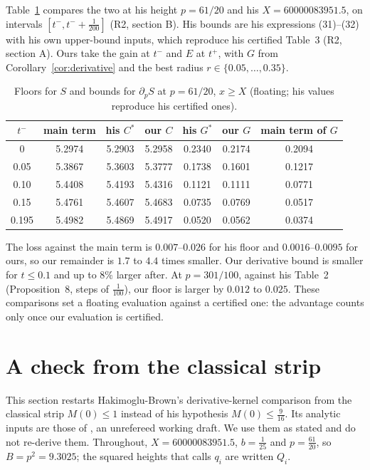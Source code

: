 \documentclass[11pt]{article}
\theoremstyle{definition}
\theoremstyle{remark}
\numberwithin{equation}{section}
\begin{document}
Table~\ref{tab:compare} compares the two at his height $p=61/20$ and his
$X=60000083951.5$, on intervals $[t^-,t^-+\frac1{200}]$ (R2, section B).
His bounds are his expressions (31)--(32) with his own upper-bound inputs,
which reproduce his certified Table~3 (R2, section A). Ours take the gain
at $t^-$ and $E$ at $t^+$, with $G$ from Corollary~\ref{cor:derivative}
and the best radius $r\in\{0.05,\dots,0.35\}$.

\begin{table}[ht]
\centering\small
\begin{tabular}{@{}ccccccc@{}}
\toprule
$t^-$ & main term & his $C^*$ & our $C$ & his $G^*$ & our $G$ & main term of $G$\\
\midrule
0 & 5.2974 & 5.2903 & 5.2958 & 0.2340 & 0.2174 & 0.2094\\
0.05 & 5.3867 & 5.3603 & 5.3777 & 0.1738 & 0.1601 & 0.1217\\
0.10 & 5.4408 & 5.4193 & 5.4316 & 0.1121 & 0.1111 & 0.0771\\
0.15 & 5.4761 & 5.4607 & 5.4683 & 0.0735 & 0.0769 & 0.0517\\
0.195 & 5.4982 & 5.4869 & 5.4917 & 0.0520 & 0.0562 & 0.0374\\
\bottomrule
\end{tabular}
\caption{Floors for $S$ and bounds for $\partial_pS$ at $p=61/20$, $x\ge X$
(floating; his values reproduce his certified ones).}\label{tab:compare}
\end{table}

The loss against the main term is $0.007$--$0.026$ for his floor and
$0.0016$--$0.0095$ for ours, so our remainder is $1.7$ to $4.4$ times
smaller. Our derivative bound is smaller for $t\le0.1$ and up to $8\%$
larger after. At $p=301/100$, against his Table~2 (Proposition~8, steps of
$\frac1{100}$), our floor is larger by $0.012$ to $0.025$. These
comparisons set a floating evaluation against a certified one: the
advantage counts only once our evaluation is certified.

\section{A check from the classical strip}\label{sec:strip}

This section restarts Hakimoglu-Brown's derivative-kernel comparison
\cite[Theorem~12]{hb} from the classical strip $M(0)\le1$ instead of his
hypothesis $M(0)\le\frac9{16}$. Its analytic inputs are those of \cite{hb},
an unrefereed working draft. We use them as stated and do not re-derive
them. Throughout, $X=60000083951.5$, $b=\frac1{25}$ and $p=\frac{61}{20}$,
so $B=p^2=9.3025$; the squared heights that \cite{hb} calls $q_i$ are
written $Q_i$.
\end{document}
